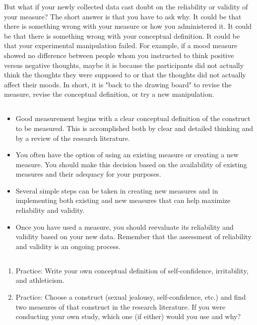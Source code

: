 But what if your newly collected data cast doubt on the reliability or validity of your measure? The short answer is that you have to ask why. It could be that there is something wrong with your measure or how you administered it. It could be that there is something wrong with your conceptual definition. It could be that your experimental manipulation failed. For example, if a mood measure showed no difference between people whom you instructed to think positive versus negative thoughts, maybe it is because the participants did not actually think the thoughts they were supposed to or that the thoughts did not actually affect their moods. In short, it is "back to the drawing board" to revise the measure, revise the conceptual definition, or try a new manipulation.


\subsection{}
\begin{fullwidth}
\begin{itemize}

\item Good measurement begins with a clear conceptual definition of the construct to be measured. This is accomplished both by clear and detailed thinking and by a review of the research literature.
\item You often have the option of using an existing measure or creating a new measure. You should make this decision based on the availability of existing measures and their adequacy for your purposes.
\item Several simple steps can be taken in creating new measures and in implementing both existing and new measures that can help maximize reliability and validity.
 
\item Once you have used a measure, you should reevaluate its reliability and validity based on your new data. Remember that the assessment of reliability and validity is an ongoing process.

\end{itemize}
\end{fullwidth}


\subsection{}
\begin{fullwidth}
\begin{enumerate}
\item Practice: Write your own conceptual definition of self-confidence, irritability, and athleticism. 
\item Practice: Choose a construct (sexual jealousy, self-confidence, etc.) and find two measures of that construct in the research literature. If you were conducting your own study, which one (if either) would you use and why?
 
\end{enumerate}
\end{fullwidth}  

